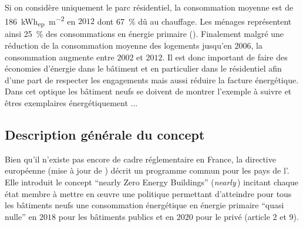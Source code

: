 Si on considère uniquement le parc résidentiel, la consommation moyenne
est de \SI{186}{\kWh_{ep}\per\metre\squared} en $2012$ dont \SI{67}{\percent} dû
au chauffage. Les ménages représentent ainsi \SI{25}{\percent} des consommations
en énergie primaire (). Finalement malgré
une réduction de la consommation moyenne des logements jusqu’en $2006$, la
consommation augmente entre $2002$ et $2012$. Il est donc important
de faire des économies d’énergie dans le bâtiment et en particulier dans le résidentiel
afin d’une part de respecter les engagements mais aussi réduire la facture énergétique.
Dans cet optique les bâtiment neufs se doivent de montrer l’exemple à suivre et
êtres exemplaires énergétiquement ...



\subsection{Description générale du concept} %
\label{sub:description_generale_du_concept}

Bien qu’il n’existe pas encore de cadre réglementaire en France,
la directive européenne  \parencite{EPBD2010} (mise à jour de \textcite{EPBD2002})
décrit un programme commun pour les pays de l’.
Elle introduit le concept \enquote{nearly Zero Energy Buildings}
(\textit{nearly}\,) incitant chaque état membre à mettre en
œuvre une politique permettant d’atteindre pour tous les bâtiments neufs une consommation
énergétique en énergie primaire \enquote{quasi nulle} en $2018$ pour les bâtiments publics
et en $2020$ pour le privé (article $2$ et $9$).

